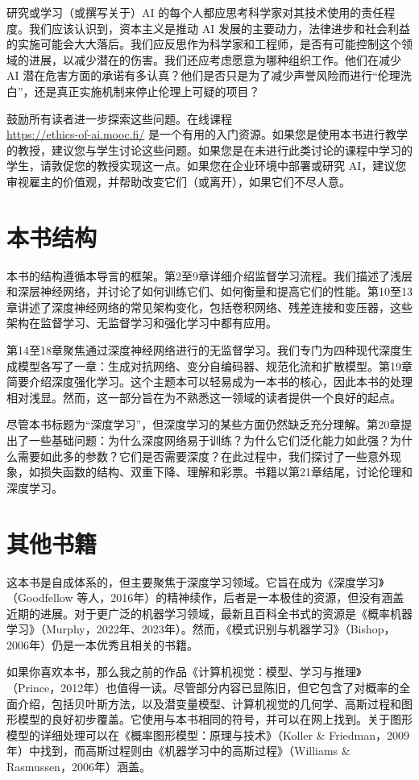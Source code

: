 \documentclass[lang=cn,newtx,10pt,scheme=chinese]{elegantbook}
\begin{document}
研究或学习（或撰写关于）AI 的每个人都应思考科学家对其技术使用的责任程度。我们应该认识到，资本主义是推动 AI 发展的主要动力，法律进步和社会利益的实施可能会大大落后。我们应反思作为科学家和工程师，是否有可能控制这个领域的进展，以减少潜在的伤害。我们还应考虑愿意为哪种组织工作。他们在减少 AI 潜在危害方面的承诺有多认真？他们是否只是为了减少声誉风险而进行“伦理洗白”，还是真正实施机制来停止伦理上可疑的项目？


鼓励所有读者进一步探索这些问题。在线课程 \\
\url{https://ethics-of-ai.mooc.fi/} 是一个有用的入门资源。如果您是使用本书进行教学的教授，建议您与学生讨论这些问题。如果您是在未进行此类讨论的课程中学习的学生，请敦促您的教授实现这一点。如果您在企业环境中部署或研究 AI，建议您审视雇主的价值观，并帮助改变它们（或离开），如果它们不尽人意。

\section{本书结构}
本书的结构遵循本导言的框架。第2至9章详细介绍监督学习流程。我们描述了浅层和深层神经网络，并讨论了如何训练它们、如何衡量和提高它们的性能。第10至13章讲述了深度神经网络的常见架构变化，包括卷积网络、残差连接和变压器，这些架构在监督学习、无监督学习和强化学习中都有应用。

第14至18章聚焦通过深度神经网络进行的无监督学习。我们专门为四种现代深度生成模型各写了一章：生成对抗网络、变分自编码器、规范化流和扩散模型。第19章简要介绍深度强化学习。这个主题本可以轻易成为一本书的核心，因此本书的处理相对浅显。然而，这一部分旨在为不熟悉这一领域的读者提供一个良好的起点。

尽管本书标题为“深度学习”，但深度学习的某些方面仍然缺乏充分理解。第20章提出了一些基础问题：为什么深度网络易于训练？为什么它们泛化能力如此强？为什么需要如此多的参数？它们是否需要深度？在此过程中，我们探讨了一些意外现象，如损失函数的结构、双重下降、理解和彩票。书籍以第21章结尾，讨论伦理和深度学习。
\section{其他书籍}
这本书是自成体系的，但主要聚焦于深度学习领域。它旨在成为《深度学习》（Goodfellow 等人，2016年）的精神续作，后者是一本极佳的资源，但没有涵盖近期的进展。对于更广泛的机器学习领域，最新且百科全书式的资源是《概率机器学习》（Murphy，2022年、2023年）。然而，《模式识别与机器学习》（Bishop，2006年）仍是一本优秀且相关的书籍。

如果你喜欢本书，那么我之前的作品《计算机视觉：模型、学习与推理》（Prince，2012年）也值得一读。尽管部分内容已显陈旧，但它包含了对概率的全面介绍，包括贝叶斯方法，以及潜变量模型、计算机视觉的几何学、高斯过程和图形模型的良好初步覆盖。它使用与本书相同的符号，并可以在网上找到。关于图形模型的详细处理可以在《概率图形模型：原理与技术》（Koller \& Friedman，2009年）中找到，而高斯过程则由《机器学习中的高斯过程》（Williams \& Rasmussen，2006年）涵盖。
\end{document}
